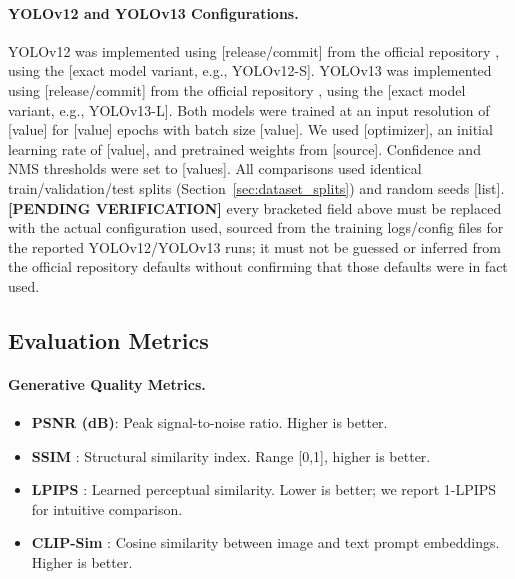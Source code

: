 \documentclass[journal]{IEEEtran}
\begin{document}
\paragraph{YOLOv12 and YOLOv13 Configurations.}
YOLOv12 was implemented using [release/commit] from the official
repository \cite{tian2025yolov12}, using the [exact model variant, e.g.,
YOLOv12-S]. YOLOv13 was implemented using [release/commit] from the
official repository \cite{lei2025yolov13}, using the [exact model
variant, e.g., YOLOv13-L]. Both models were trained at an input
resolution of [value] for [value] epochs with batch size [value]. We used
[optimizer], an initial learning rate of [value], and pretrained weights
from [source]. Confidence and NMS thresholds were set to [values]. All
comparisons used identical train/validation/test splits (Section~\ref{sec:dataset_splits})
and random seeds [list]. \textbf{[PENDING VERIFICATION]} every bracketed
field above must be replaced with the actual configuration used, sourced
from the training logs/config files for the reported YOLOv12/YOLOv13 runs;
it must not be guessed or inferred from the official repository defaults
without confirming that those defaults were in fact used.

\subsection{Evaluation Metrics}

\paragraph{Generative Quality Metrics.}
\begin{itemize}
    \item \textbf{PSNR (dB)}: Peak signal-to-noise ratio. Higher is better.
    \item \textbf{SSIM} \cite{1284395}: Structural similarity index. Range [0,1], higher is better.
    \item \textbf{LPIPS} \cite{zhang2018unreasonableeffectivenessdeepfeatures}: Learned perceptual similarity. Lower is better; we report 1-LPIPS for intuitive comparison.
    \item \textbf{CLIP-Sim} \cite{radford2021learningtransferablevisualmodels}: Cosine similarity between image and text prompt embeddings. Higher is better.
\end{itemize}
\end{document}
